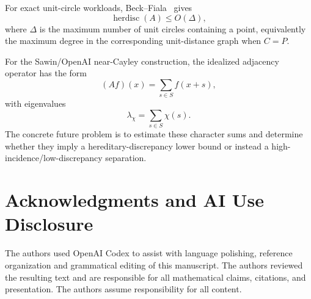 \documentclass[11pt]{article}
\DeclareMathOperator{\herdisc}{herdisc}
\begin{document}
For exact unit-circle workloads, Beck--Fiala~\cite{BeckFiala81} gives
\[
\herdisc(A)\le O(\Delta),
\]
where \(\Delta\) is the maximum number of unit circles containing a point, equivalently the maximum degree in the corresponding unit-distance graph when \(C=P\).

For the Sawin/OpenAI near-Cayley construction, the idealized adjacency operator has the form
\[
(Af)(x)=\sum_{s\in S} f(x+s),
\]
with eigenvalues
\[
\lambda_\chi=\sum_{s\in S}\chi(s).
\]
The concrete future problem is to estimate these character sums and determine whether they imply a hereditary-discrepancy lower bound or instead a high-incidence/low-discrepancy separation.

\section*{Acknowledgments and AI Use Disclosure}

The authors used OpenAI Codex to assist with language polishing, reference organization and grammatical editing of this manuscript. The authors reviewed the resulting text and are responsible for all mathematical claims, citations, and presentation. The authors assume responsibility for all content.



\end{document}
